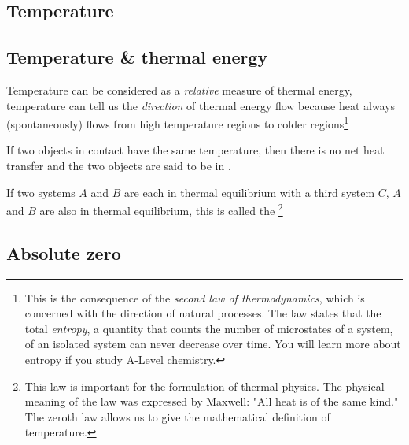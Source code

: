 

\subsection{Temperature}

\subsection{Temperature \& thermal energy}

Temperature can be considered as a \emph{relative} measure of thermal energy, temperature can tell us the \emph{direction} of thermal energy flow because heat always (spontaneously) flows from high temperature regions to colder regions\footnote{This is the consequence of the \emph{second law of thermodynamics}, which is concerned with the direction of natural processes. The law states that the total \emph{entropy}, a quantity that counts the number of microstates of a system, of an isolated system can never decrease over time. You will learn more about entropy if you study A-Level chemistry.}

If two objects in contact have the same temperature, then there is no net heat transfer and the two objects are said to be in .

If two systems $A$ and $B$ are each in thermal equilibrium with a third system $C$, $A$ and $B$ are also in thermal equilibrium, this is called the 
\footnote{This law is important for the formulation of thermal physics. The physical meaning of the law was expressed by Maxwell: "All heat is of the same kind." The zeroth law allows us to give the mathematical definition of temperature.}


\subsection{Absolute zero}\label{s-abs-zero}

